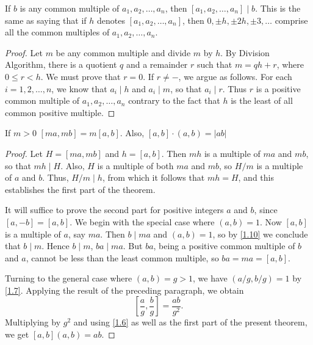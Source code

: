 \documentclass[11pt]{article}
\begin{document}
\begin{theorem}\label{1.12}
    If \(b\) is any common multiple of \(a_1, a_2, \ldots, a_n\), then \([a_1, a_2, \ldots, a_n] \mid b\). This is the same as saying that if \(h\) denotes \([a_1, a_2, \ldots, a_n]\), then \(0, \pm h, \pm 2h, \pm 3, \ldots\) comprise all the common multiples of \(a_1, a_2, \ldots, a_n\).
\end{theorem}
\begin{proof}
    Let \(m\) be any common multiple and divide \(m\) by \(h\). By Division Algorithm, there is a quotient \(q\) and a remainder \(r\) such that \(m = qh + r\), where \(0 \leqslant r < h\). We must prove that \(r = 0\). If \(r \neq -\), we argue as follows. For each \(i = 1, 2, \ldots, n\), we know that \(a_i \mid h\) and \(a_i \mid m\), so that \(a_i \mid r\). Thus \(r\) is a positive common multiple of \(a_1, a_2, \ldots, a_n\) contrary to the fact that \(h\) is the least of all common positive multiple.
\end{proof}

\begin{theorem}\label{1.13}
    If \(m > 0\) \([ma, mb] = m[a, b]\). Also, \([a,b] \cdot (a, b) = |ab|\)
\end{theorem}
\begin{proof}
    Let \( H = [ma, mb] \) and \( h = [a, b] \). Then \( mh \) is a multiple of \( ma \) and \( mb \), so that \( mh \mid H \). Also, \( H \) is a multiple of both \( ma \) and \( mb \), so \( H / m \) is a multiple of \( a \) and \( b \). Thus, \( H / m \mid h \), from which it follows that \( mh = H \), and this establishes the first part of the theorem.

    It will suffice to prove the second part for positive integers \( a \) and \( b
    \), since \( [a, -b] = [a, b] \). We begin with the special case where \( (a,
    b) = 1 \). Now \( [a, b] \) is a multiple of \( a \), say \( ma \). Then \( b
    \mid ma \) and \( (a, b) = 1 \), so by \cref{1.10} we conclude that \( b \mid m
    \). Hence \( b \mid m \), \( ba \mid ma \). But \( ba \), being a positive
    common multiple of \( b \) and \( a \), cannot be less than the least common
    multiple, so \( ba = ma = [a, b] \).

    Turning to the general case where \( (a, b) = g > 1 \), we have \( (a/g, b/g) =
    1 \) by \cref{1.7}. Applying the result of the preceding paragraph, we obtain
    \[
        \left[ \frac{a}{g}, \frac{b}{g} \right] = \frac{ab}{g^2}.
    \]
    Multiplying by \( g^2 \) and using \cref{1.6} as well as the first part of the
    present theorem, we get \( [a, b](a, b) = ab \).
\end{proof}
\end{document}
